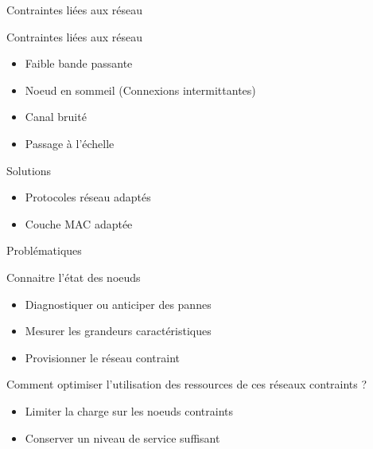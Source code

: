 \begin{frame}{Contraintes liées aux réseau}

  \begin{block}{Contraintes liées aux réseau}
    \begin{itemize}
      \item Faible bande passante
      \item Noeud en sommeil (Connexions intermittantes)
      \item Canal bruité
      \item Passage à l'échelle
    \end{itemize}
  \end{block}

  \begin{alertblock}{Solutions}
    \begin{itemize}
      \item Protocoles réseau adaptés
      \item Couche MAC adaptée
    \end{itemize}
  \end{alertblock}

\end{frame}

\begin{frame}{Problématiques}
  \begin{block}{Connaitre l'état des noeuds}
    \begin{itemize}
      \item Diagnostiquer ou anticiper des pannes
      \item Mesurer les grandeurs caractéristiques
      \item Provisionner le réseau contraint
    \end{itemize}
  \end{block}

  \begin{block}{Comment optimiser l'utilisation des ressources de ces réseaux contraints ?}
    \begin{itemize}
      \item Limiter la charge sur les noeuds contraints
      \item Conserver un niveau de service suffisant
    \end{itemize}
  \end{block}

\end{frame}

